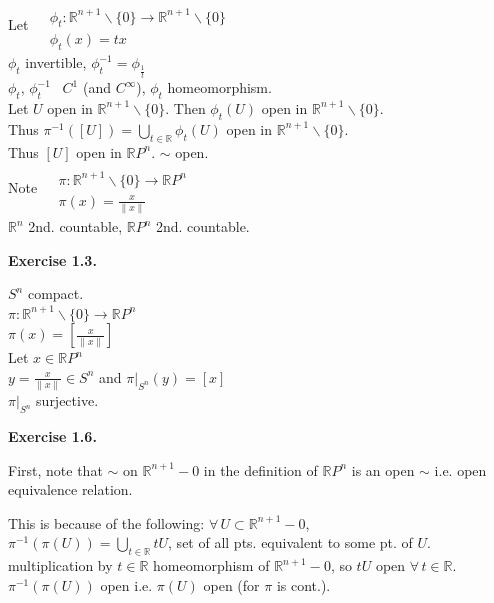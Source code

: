 \documentclass[11pt]{amsart}
\theoremstyle{definition}
\newcommand{\exercisehead}[1]{\medskip\noindent\textbf{Exercise #1.} }
\begin{document}
Let $ \begin{aligned} & \quad \\
  & \phi_t : \mathbb{R}^{n+1}\backslash \lbrace  0 \rbrace \to \mathbb{R}^{n+1} \backslash \lbrace 0 \rbrace \\
  & \phi_t(x) = tx \end{aligned}$ \\
$\phi_t$ invertible, $\phi_t^{-1} = \phi_{\frac{1}{t}}$ \\
$\phi_t$, $\phi_t^{-1}$ \, $C^1$ (and $C^{\infty}$), $\phi_t$ homeomorphism.  \\

Let $U$ open in $\mathbb{R}^{n+1}\backslash \lbrace 0 \rbrace$.  Then $\phi_t(U)$ open in $\mathbb{R}^{n+1}\backslash \lbrace 0 \rbrace$.  \\
Thus $\pi^{-1}([U]) = \bigcup_{t \in \mathbb{R}} \phi_t(U)$ open in $\mathbb{R}^{n+1}\backslash \lbrace 0 \rbrace$.  \\
Thus $[U]$ open in $\mathbb{R}P^n$.  $\sim$ open.  \\

Note $\begin{aligned} & \quad  \\
  & \pi : \mathbb{R}^{n+1} \backslash \lbrace 0 \rbrace \to \mathbb{R}P^n \\
  & \pi(x) = \frac{x}{ \| x\| } \end{aligned}$ \\
$\mathbb{R}^n$ 2nd. countable, $\mathbb{R}P^n$ 2nd. countable.


\exercisehead{1.3}

$S^n$ compact. \\
$\pi :\mathbb{R}^{n+1}\backslash \lbrace 0 \rbrace \to \mathbb{R}P^n$ \\
$\pi(x) = [ \frac{x}{ \| x \| } ]$ \\
Let $x \in \mathbb{R}P^n$ \\
\phantom{Let } $y = \frac{x}{ \| x \| } \in S^n$ and $ \left. \pi \right|_{S^n}(y) = [x]$ \\
$\left. \pi \right|_{S^n}$ surjective.



\exercisehead{1.6}

First, note that $\sim $ on $\mathbb{R}^{n+1} -0$ in the definition of $\mathbb{R}P^n$ is an open $\sim$ i.e. open equivalence relation.

This is because of the following:
$\forall \, U \subset \mathbb{R}^{n+1}-0$, \\
$\pi^{-1}(\pi(U)) = \bigcup_{t\in \mathbb{R}} tU$, set of all pts. equivalent to some pt. of $U$.  \\
multiplication by $t\in \mathbb{R}$ homeomorphism of $\mathbb{R}^{n+1} - 0$, so $tU$ open $\forall \, t \in \mathbb{R}$.  \\
$\pi^{-1}(\pi(U))$ open i.e. $\pi(U)$ open (for $\pi$ is cont.).
\end{document}
